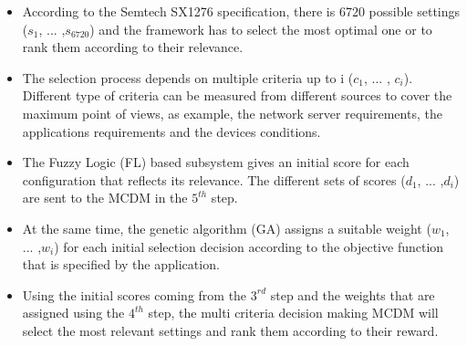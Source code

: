 \begin{itemize}
	\item According to the Semtech SX1276 specification, there is 6720 possible settings ($s_{1}$, ... ,$s_{6720}$) and the framework has to select the most optimal one or to rank them according to their relevance.
	\item The selection process depends on multiple criteria up to i ($c_{1}$, ... , $c_{i}$).
		Different type of criteria can be measured from different sources to cover the maximum point of views,
		as example,
		the network server requirements, the applications requirements and the devices conditions.
	\item The Fuzzy Logic (FL) based subsystem gives an initial score for each configuration that reflects its relevance.
		The different sets of scores ($d_{1}$, ... ,$d_{i}$) are sent to the \ac{MCDM} in the $5^{th}$ step.
	\item At the same time,
			the genetic algorithm (GA) assigns a suitable weight ($w_{1}$, ... ,$w_{i}$) for each initial selection decision according to the objective function that is specified by the application.
	\item Using the initial scores coming from the $3^{rd}$ step and the weights that are assigned using the $4^{th}$ step,
			the multi criteria decision making \ac{MCDM} will select the most relevant settings and rank them according to their reward.
\end{itemize}

